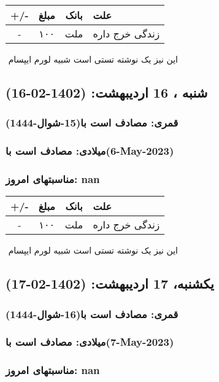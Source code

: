 \documentclass{article}
\newcommand{\rnote}[1]{\marginpar{\textcolor{color}{\StrSubstitute{\##1}{ }{\_}}}}
\newcommand{\myRow}[4]{
    #1 & #2 & #3 & #4 \\ \hline
}
\begin{document}
\begin{tabular}{ | c | c | c | p{5cm} |}
    \hline
    \myRow{ +/- }{مبلغ}{بانک}{علت}
    \myRow{-}{۱۰۰}{ملت}{زندگی خرج داره}
\end{tabular}
\newline
\newline

‌
\rnote{تست}
این نیز یک نوشته تستی است شبیه لورم ایپسام




\newpage
{}
\textcolor{color}{
\section{ شنبه ، 16 اردیبهشت: (1402-02-16) }
\subsubsection*{قمری: مصادف است با(15-شوال-1444)} 
\subsubsection*{میلادی: مصادف است با(6-May-2023)}
\subsubsection*{مناسبتهای امروز: nan}
}


\begin{tabular}{ | c | c | c | p{5cm} |}
    \hline
    \myRow{ +/- }{مبلغ}{بانک}{علت}
    \myRow{-}{۱۰۰}{ملت}{زندگی خرج داره}
\end{tabular}
\newline
\newline

‌
\rnote{تست}
این نیز یک نوشته تستی است شبیه لورم ایپسام




\newpage
{}
\textcolor{color}{
\section{ یکشنبه، 17 اردیبهشت: (1402-02-17) }
\subsubsection*{قمری: مصادف است با(16-شوال-1444)} 
\subsubsection*{میلادی: مصادف است با(7-May-2023)}
\subsubsection*{مناسبتهای امروز: nan}
}
\end{document}
